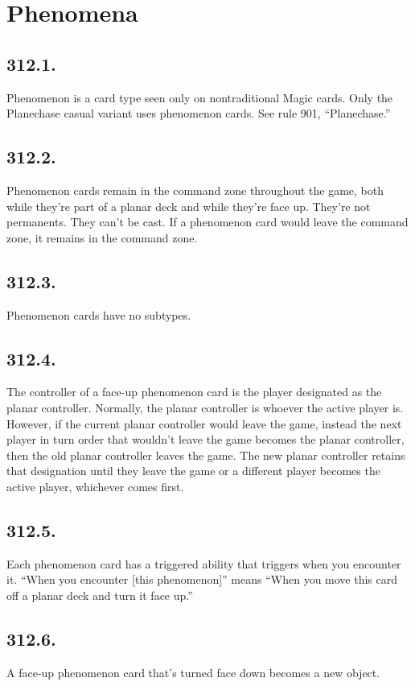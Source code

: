\section{Phenomena}
\subsection*{312.1.}
Phenomenon is a card type seen only on nontraditional Magic cards. Only the Planechase casual variant uses phenomenon cards. See rule 901, “Planechase.”

\subsection*{312.2.}
Phenomenon cards remain in the command zone throughout the game, both while they’re part of a planar deck and while they’re face up. They’re not permanents. They can’t be cast. If a phenomenon card would leave the command zone, it remains in the command zone.

\subsection*{312.3.}
Phenomenon cards have no subtypes.

\subsection*{312.4.}
The controller of a face-up phenomenon card is the player designated as the planar controller. Normally, the planar controller is whoever the active player is. However, if the current planar controller would leave the game, instead the next player in turn order that wouldn’t leave the game becomes the planar controller, then the old planar controller leaves the game. The new planar controller retains that designation until they leave the game or a different player becomes the active player, whichever comes first.

\subsection*{312.5.}
Each phenomenon card has a triggered ability that triggers when you encounter it. “When you encounter [this phenomenon]” means “When you move this card off a planar deck and turn it face up.”

\subsection*{312.6.}
A face-up phenomenon card that’s turned face down becomes a new object.

